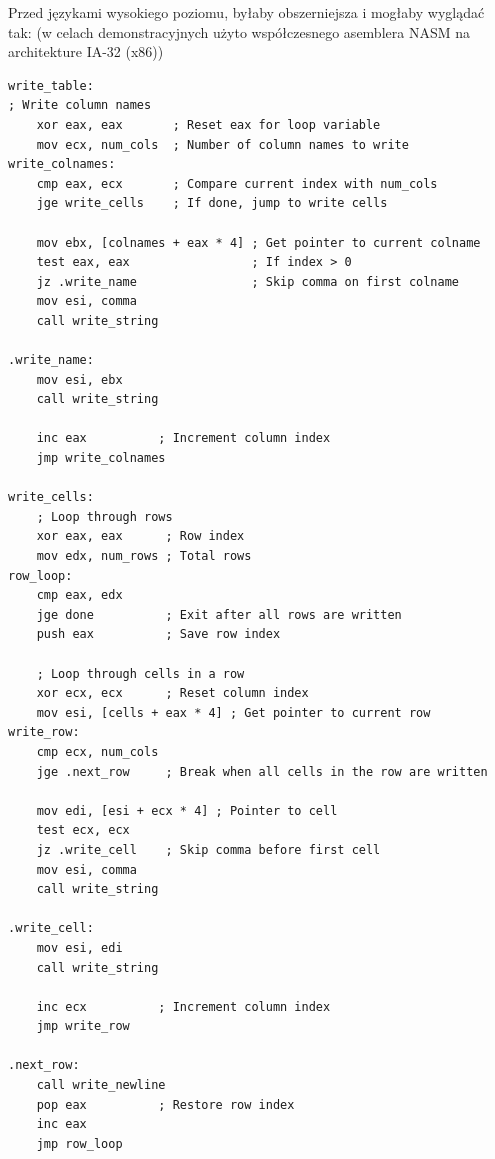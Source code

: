 Przed językami wysokiego poziomu, byłaby obszerniejsza i mogłaby wyglądać tak:
(w celach demonstracyjnych użyto współczesnego asemblera NASM na architekture IA-32 (x86))

\begin{lstlisting}
write_table:
; Write column names
    xor eax, eax       ; Reset eax for loop variable
    mov ecx, num_cols  ; Number of column names to write
write_colnames:
    cmp eax, ecx       ; Compare current index with num_cols
    jge write_cells    ; If done, jump to write cells

    mov ebx, [colnames + eax * 4] ; Get pointer to current colname
    test eax, eax                 ; If index > 0
    jz .write_name                ; Skip comma on first colname
    mov esi, comma
    call write_string

.write_name:
    mov esi, ebx
    call write_string

    inc eax          ; Increment column index
    jmp write_colnames

write_cells:
    ; Loop through rows
    xor eax, eax      ; Row index
    mov edx, num_rows ; Total rows
row_loop:
    cmp eax, edx
    jge done          ; Exit after all rows are written
    push eax          ; Save row index

    ; Loop through cells in a row
    xor ecx, ecx      ; Reset column index
    mov esi, [cells + eax * 4] ; Get pointer to current row
write_row:
    cmp ecx, num_cols
    jge .next_row     ; Break when all cells in the row are written

    mov edi, [esi + ecx * 4] ; Pointer to cell
    test ecx, ecx
    jz .write_cell    ; Skip comma before first cell
    mov esi, comma
    call write_string

.write_cell:
    mov esi, edi
    call write_string

    inc ecx          ; Increment column index
    jmp write_row

.next_row:
    call write_newline
    pop eax          ; Restore row index
    inc eax
    jmp row_loop
\end{lstlisting}

